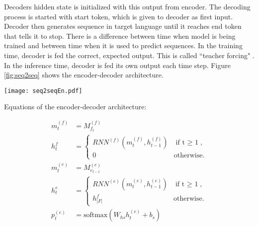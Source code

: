 \documentclass{ExcelAtFIT}
\begin{document}
Decoders hidden state is initialized with this output from encoder. The decoding process is started with start token, which is given to decoder as first input. Decoder then generates sequence in target language until it reaches end token that tells it to stop. There is a difference between time when model is being trained and between time when it is used to predict sequences. In the training time, decoder is fed the correct, expected output. This is called ``teacher forcing" \cite{teacherForcing}. In the inference time, decoder is fed its own output each time step. Figure \ref{fig:seq2seq} shows the encoder-decoder architecture.

\begin{figure*}[h!]\centering %
  \centering
  \texttt{[image: seq2seqEn.pdf]}\\[1pt]
  \caption{Encoder-decoder architecture shown on translation from Czech sentence to its English equivalent. Encoder processes embeddings of input sequence and produces fixed-length ``thought" vector. This vector is used as initial state of decoder, it tells it from what context should it produce output in target language. Prediction is started with the $\langle s \rangle$ starting token. Then the decoder is fed either correct output tokens during training time or its own output, from time $t - 1$, during inference time, until it generates the ending $\langle /s \rangle$ token.}
  \label{fig:seq2seq}
\end{figure*}

\hfill \break
Equations of the encoder-decoder architecture:
\begin{linenomath}
\begin{align}
    m^{(f)}_{t}&=M^{(f)}_{f_t}\label{figure:encoderEmb} \\
    h^{f}_{t}&=\begin{cases}
                    RNN^{(f)}(m^{(f)}_{t},h^{(f)}_{t-1}) & \mbox{if t $\geq$ 1},\label{figure:encoderState} \\
                    0 & \mbox{otherwise}.
                \end{cases}\\
    m^{(e)}_{t}&=M^{(e)}_{e_{t-1}}\label{figure:decoderEmb} \\
    h^{e}_{t}&=\begin{cases}
                    RNN^{(e)}(m^{(e)}_{t},h^{(e)}_{t-1}) & \mbox{if t $\geq$ 1},\\
                    h^{f}_{|F|} & \mbox{otherwise}.
                \end{cases}\label{figure:decoderState} \\
    p^{(e)}_{t}&=\mbox{softmax}(W_{hs}h^{(e)}_{t} + b_{s}) \label{figure:resultSoftmax}
\end{align}
\end{linenomath}
\end{document}
